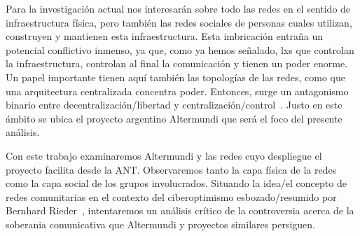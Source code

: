 \begin{comment}
por qué es importante/interesante?
	\item Erläutern Sie kurz, in welchem Themenbereich Ihre Arbeit angesiedelt ist. Wo werden Sie einen Beitrag leisten?
	\item Das Ziel sollte es sein, den groben Kontext Ihrer Arbeit darzustellen.

Política digital <-- Gabriella Coleman heranziehen

[Sharp2010]

"The dictators’ access to material resources also directly affects
their power. With control of financial resources, the economic
system, property, natural resources, transportation, and means of
communication in the hands of actual or potential opponents of
the regime, another major source of their power is vulnerable or re-
moved. Strikes, boycotts, and increasing autonomy in the economy,
communications, and transportation will weaken the regime." (s.68)
As previously discussed, the dictators’ ability to threaten

\end{comment}

Para la investigación actual nos interesarán sobre todo las redes en el sentido de infraestructura física, pero también las redes sociales de personas cuales utilizan, construyen y mantienen esta infraestructura.
Esta imbricación entraña un potencial conflictivo inmenso, ya que, como ya hemos señalado, lxs que controlan la infraestructura, controlan al final la comunicación y tienen un poder enorme.
Un papel importante tienen aquí también las topologías de las redes, como que una arquitectura centralizada concentra poder.
Entonces, surge un antagonismo binario entre decentralización/libertad y centralización/control~\autocite{FiTre2015}.
Justo en este ámbito se ubica el proyecto argentino Altermundi que será el foco del presente análisis.



Con este trabajo examinaremos Altermundi y las redes cuyo despliegue el proyecto facilita desde la ANT.
Observaremos tanto la capa física de la redes como la capa social de los grupos involucrados.
Situando la idea/el concepto de redes comunitarias en el contexto del ciberoptimismo esbozado/resumido por Bernhard Rieder~\autocite{Rieder2012}, intentaremos un análisis crítico de la controversia acerca de la soberania comunicativa que Altermundi y proyectos similares persiguen.

